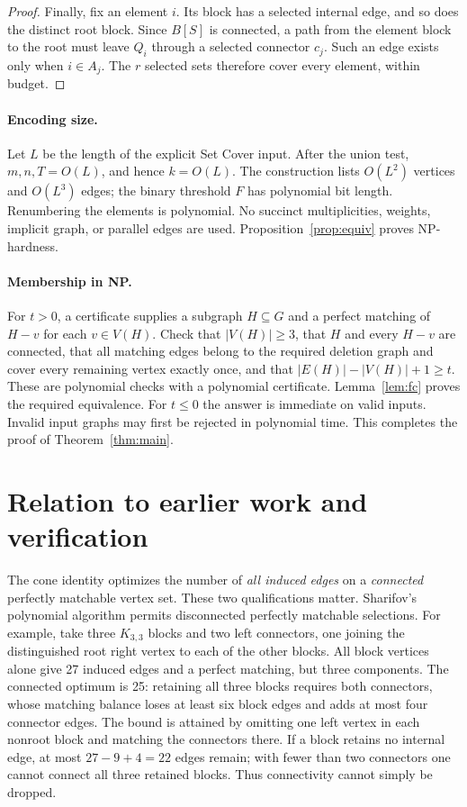 \documentclass[11pt]{article}
\begin{document}
\begin{proof}
Finally, fix an element \(i\). Its block has a selected internal edge,
and so does the distinct root block. Since \(B[S]\) is connected, a
path from the element block to the root must leave \(Q_i\) through a
selected connector \(c_j\). Such an edge exists only when \(i\in A_j\).
The \(r\) selected sets therefore cover every element, within budget.
\end{proof}

\paragraph{Encoding size.}
Let \(L\) be the length of the explicit Set Cover input. After the union
test, \(m,n,T=O(L)\), and hence \(k=O(L)\). The construction lists
\(O(L^2)\) vertices and \(O(L^3)\) edges; the binary threshold \(F\)
has polynomial bit length. Renumbering the elements is polynomial.
No succinct multiplicities, weights, implicit graph, or parallel edges
are used. Proposition~\ref{prop:equiv} proves NP-hardness.

\paragraph{Membership in NP.}
For \(t>0\), a certificate supplies a subgraph \(H\subseteq G\) and
a perfect matching of \(H-v\) for each \(v\in V(H)\). Check that
\(|V(H)|\ge3\), that \(H\) and every \(H-v\) are connected, that all
matching edges belong to the required deletion graph and cover every
remaining vertex exactly once, and that
\(|E(H)|-|V(H)|+1\ge t\). These are polynomial checks with a polynomial
certificate. Lemma~\ref{lem:fc} proves the required equivalence.
For \(t\le0\) the answer is immediate on valid inputs. Invalid input
graphs may first be rejected in polynomial time. This completes the
proof of Theorem~\ref{thm:main}.

\section{Relation to earlier work and verification}
The cone identity optimizes the number of \emph{all induced edges} on
a \emph{connected} perfectly matchable vertex set. These two qualifications
matter. Sharifov's polynomial algorithm \cite{Sharifov} permits
disconnected perfectly matchable selections. For example, take three
\(K_{3,3}\) blocks and two left connectors, one joining the distinguished
root right vertex to each of the other blocks. All block vertices alone
give 27 induced edges and a perfect matching, but three components.
The connected optimum is 25: retaining all three blocks requires both
connectors, whose matching balance loses at least six block edges and
adds at most four connector edges. The bound is attained by omitting
one left vertex in each nonroot block and matching the connectors there.
If a block retains no internal edge, at most
\(27-9+4=22\) edges remain; with fewer than two connectors one cannot connect
all three retained blocks. Thus connectivity cannot simply be dropped.
\end{document}
